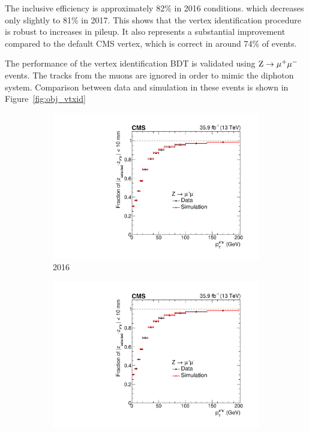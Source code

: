 The inclusive efficiency is approximately 82\% in 2016 conditions.
which decreases only slightly to 81\% in 2017.
This shows that the vertex identification procedure is robust to increases in pileup.
It also represents a substantial improvement compared to the default CMS vertex, %
which is correct in around 74\% of events.

The performance of the vertex identification BDT is
validated using $\mathrm{Z}\rightarrow{\mu^{+}\mu^{-}}$ events.
The tracks from the muons are ignored in order to mimic the diphoton system.
Comparison between data and simulation in these events is shown in Figure~\ref{fig:obj_vtxid}

\begin{figure}[h!]
  \centering
  \begin{subfigure}{0.49\textwidth}
    \includegraphics[width=\textwidth]{Figures/Objects/vtxid_2016}
    \caption{2016}
    \label{fig:obj_vtxid_2016}
  \end{subfigure}
  \begin{subfigure}{0.49\textwidth}
    \includegraphics[width=\textwidth]{Figures/Objects/vtxid_2016}

\end{subfigure}
\end{figure}
